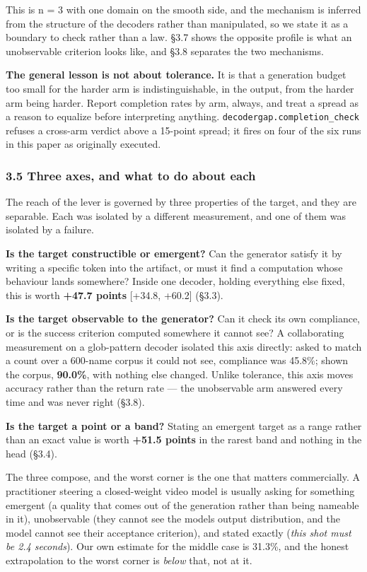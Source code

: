 \documentclass[
  10pt,
]{article}
\theoremstyle{plain}
\theoremstyle{definition}
\begin{document}
This is n = 3 with one domain on the smooth side, and the mechanism is
inferred from the structure of the decoders rather than manipulated, so
we state it as a boundary to check rather than a law. §3.7 shows the
opposite profile is what an unobservable criterion looks like, and §3.8
separates the two mechanisms.

\textbf{The general lesson is not about tolerance.} It is that a
generation budget too small for the harder arm is indistinguishable, in
the output, from the harder arm being harder. Report completion rates by
arm, always, and treat a spread as a reason to equalize before
interpreting anything. \texttt{decodergap.completion\_check} refuses a
cross-arm verdict above a 15-point spread; it fires on four of the six
runs in this paper as originally executed.

\subsubsection{3.5 Three axes, and what to do about
each}\label{35-three-axes-and-what-to-do-about-each}

The reach of the lever is governed by three properties of the target,
and they are separable. Each was isolated by a different measurement,
and one of them was isolated by a failure.

\textbf{Is the target constructible or emergent?} Can the generator
satisfy it by writing a specific token into the artifact, or must it
find a computation whose behaviour lands somewhere? Inside one decoder,
holding everything else fixed, this is worth \textbf{+47.7 points}
{[}+34.8, +60.2{]} (§3.3).

\textbf{Is the target observable to the generator?} Can it check its own
compliance, or is the success criterion computed somewhere it cannot
see? A collaborating measurement on a glob-pattern decoder isolated this
axis directly: asked to match a count over a 600-name corpus it could
not see, compliance was 45.8\%; shown the corpus, \textbf{90.0\%}, with
nothing else changed. Unlike tolerance, this axis moves accuracy rather
than the return rate --- the unobservable arm answered every time and
was never right (§3.8).

\textbf{Is the target a point or a band?} Stating an emergent target as
a range rather than an exact value is worth \textbf{+51.5 points} in the
rarest band and nothing in the head (§3.4).

The three compose, and the worst corner is the one that matters
commercially. A practitioner steering a closed-weight video model is
usually asking for something emergent (a quality that comes out of the
generation rather than being nameable in it), unobservable (they cannot
see the model\textquotesingle s output distribution, and the model
cannot see their acceptance criterion), and stated exactly (\emph{this
shot must be 2.4 seconds}). Our own estimate for the middle case is
31.3\%, and the honest extrapolation to the worst corner is \emph{below}
that, not at it.
\end{document}
